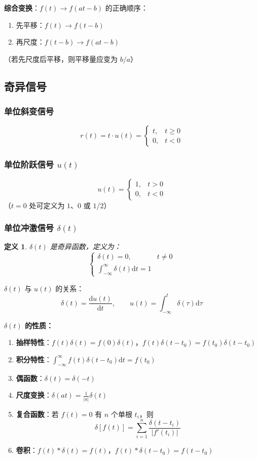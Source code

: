 \documentclass[11pt,a4paper]{ctexart}
\newtheorem{definition}{定义}[section]
\newcommand{\dd}{\mathrm{d}}            %
\newcommand{\dirac}{\delta}             %
\begin{document}
\textbf{综合变换}：$f(t) \to f(at - b)$ 的正确顺序：
\begin{enumerate}
    \item 先平移：$f(t) \to f(t - b)$
    \item 再尺度：$f(t - b) \to f(at - b)$
\end{enumerate}
（若先尺度后平移，则平移量应变为 $b/a$）

\subsection{奇异信号}

\subsubsection{单位斜变信号}
\[
r(t) = t \cdot u(t) = \begin{cases} t, & t \ge 0 \\ 0, & t < 0 \end{cases}
\]

\subsubsection{单位阶跃信号 $u(t)$}
\[
u(t) = \begin{cases} 1, & t > 0 \\ 0, & t < 0 \end{cases}
\]
（$t = 0$ 处可定义为 $1$、$0$ 或 $1/2$）

\subsubsection{单位冲激信号 $\dirac(t)$}

\begin{definition}
$\dirac(t)$ 是奇异函数，定义为：
\[
\begin{cases}
\dirac(t) = 0, & t \neq 0 \\
\displaystyle\int_{-\infty}^{\infty} \dirac(t)\dd t = 1
\end{cases}
\]
\end{definition}

$\dirac(t)$ 与 $u(t)$ 的关系：
\[
\dirac(t) = \frac{\dd u(t)}{\dd t},\qquad u(t) = \int_{-\infty}^{t} \dirac(\tau)\dd\tau
\]

\textbf{$\dirac(t)$ 的性质：}
\begin{enumerate}
    \item \textbf{抽样特性}：$f(t)\dirac(t) = f(0)\dirac(t)$，$f(t)\dirac(t - t_0) = f(t_0)\dirac(t - t_0)$
    \item \textbf{积分特性}：$\displaystyle\int_{-\infty}^{\infty} f(t)\dirac(t - t_0)\dd t = f(t_0)$
    \item \textbf{偶函数}：$\dirac(t) = \dirac(-t)$
    \item \textbf{尺度变换}：$\dirac(at) = \frac{1}{|a|}\dirac(t)$
    \item \textbf{复合函数}：若 $f(t) = 0$ 有 $n$ 个单根 $t_i$，则
    \[
    \dirac[f(t)] = \sum_{i=1}^{n} \frac{\dirac(t - t_i)}{|f'(t_i)|}
    \]
    \item \textbf{卷积}：$f(t) * \dirac(t) = f(t)$，$f(t) * \dirac(t - t_0) = f(t - t_0)$
\end{enumerate}
\end{document}
